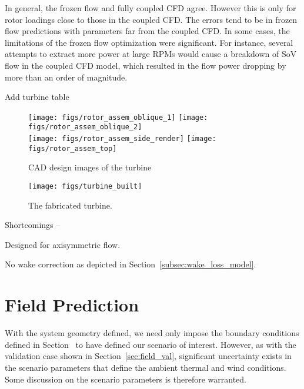 In general, the frozen flow and fully coupled CFD agree. However this is
only for rotor loadings close to those in the coupled CFD. The errors
tend to be in frozen flow predictions with parameters far from the
coupled CFD. In some cases, the limitations of the frozen flow
optimization were significant. For instance, several attempts
to extract more power at large RPMs would cause a breakdown of SoV
flow in the coupled CFD model, which resulted in the flow power dropping
by more than an order of magnitude.

Add turbine table

  \begin{figure}
   \centering
   \texttt{[image: figs/rotor\_assem\_oblique\_1]}
   \hfill
   \texttt{[image: figs/rotor\_assem\_oblique\_2]}
   \\
   \vspace{1em}
   \texttt{[image: figs/rotor\_assem\_side\_render]}
   \hfill
   \texttt{[image: figs/rotor\_assem\_top]}
   \\   
   \caption{CAD design images of the turbine} 
   \label{fig:cad_turbine}
  \end{figure}


  \begin{figure}
   \centering
   \texttt{[image: figs/turbine\_built]}
   \caption{The fabricated turbine.} 
   \label{fig:turbine_built}
  \end{figure}

Shortcomings -- 

Designed for axisymmetric flow. 

No wake correction as depicted in Section~\ref{subsec:wake_loss_model}.    


\section{Field Prediction}
\label{subsec:field_predict}

With the system geometry defined, we need only impose the boundary
conditions defined in Section~\label{sec:bc} to have defined our
scenario of interest. However, as with the validation case shown in
Section~\ref{sec:field_val}, significant uncertainty exists in the
scenario parameters that define the ambient thermal and wind
conditions. Some discussion on the scenario parameters is therefore
warranted. 

